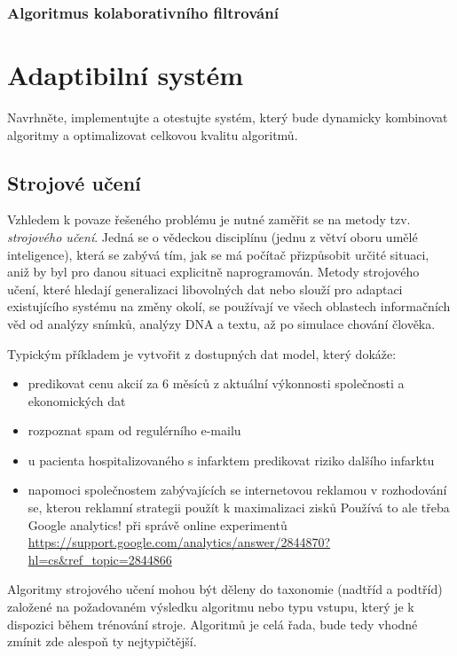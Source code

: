 \documentclass[thesis=M,czech]{FITthesis}[2014/05/07]
\begin{document}
\subsection{Algoritmus kolaborativního filtrování}

\chapter{Adaptibilní systém}
\label{chap:adapt}
Navrhněte, implementujte a otestujte systém, který bude dynamicky kombinovat algoritmy a optimalizovat celkovou kvalitu algoritmů.
\label{chap:ensemble}

\section{Strojové učení}

Vzhledem k povaze řešeného problému je nutné zaměřit se na metody tzv. \emph{strojového učení}. 
Jedná se o vědeckou disciplínu (jednu z větví oboru umělé inteligence), která se zabývá tím, jak se má počítač přizpůsobit určité situaci, aniž by byl pro danou situaci explicitně naprogramován. Metody strojového učení, které hledají generalizaci libovolných dat nebo slouží pro adaptaci existujícího systému na změny okolí, se používají ve všech oblastech informačních věd od analýzy snímků, analýzy DNA a textu, až po simulace chování člověka. 

Typickým příkladem je vytvořit z dostupných dat model, který dokáže:

\begin{itemize}
  \item predikovat cenu akcií za 6 měsíců z aktuální výkonnosti společnosti a ekonomických dat
  \item rozpoznat spam od regulérního e-mailu
  \item u pacienta hospitalizovaného s infarktem predikovat riziko dalšího infarktu
  \item napomoci společnostem zabývajících se internetovou reklamou v rozhodování se, kterou reklamní strategii použít k maximalizaci zisků
  Používá to ale třeba Google analytics! při správě online experimentů
\url{https://support.google.com/analytics/answer/2844870?hl=cs&ref_topic=2844866}
\end{itemize}

Algoritmy strojového učení mohou být děleny do taxonomie (nadtříd a podtříd) založené na požadovaném výsledku algoritmu nebo typu vstupu, který je k dispozici během trénování stroje. Algoritmů je celá řada, bude tedy vhodné zmínit zde alespoň ty nejtypičtější. 
\end{document}
